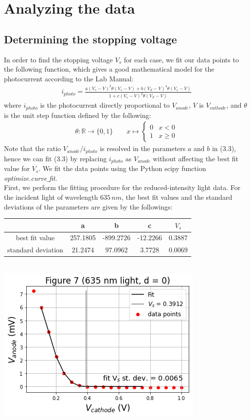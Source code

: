 \documentclass[11pt]{book}
\theoremstyle{break}
\theoremstyle{break}
\newcommand{\R}{\mathbb{R}}
\begin{document}
\hfill\break
\hfill\break
\hfill\break
\section{Analyzing the data}
\subsection{Determining the stopping voltage}
In order to find the stopping voltage $V_s$ for each case, we fit our data points to the following function, which gives a good mathematical model for the photocurrent according to the Lab Manual:
\begin{align}
i_{photo} = \frac{a(V_s - V)^2\theta(V_s - V) + b(V_S - V)^4 \theta(V_s -V)}{1+c(V_s - V)^2 \theta(V_S-V)}
\end{align}
where $i_{photo}$ is the photocurrent directly proportional to $V_{anode}$, $V$ is $V_{cathode}$, and $\theta$ is the unit step function defined by the following:
\begin{align*}
\theta: \R \to \{0,1\} \qquad x\mapsto \begin{cases}
0 & x<0 \\
1 & x\geq 0
\end{cases}
\end{align*}
Note that the ratio $V_{anode}/i_{photo}$ is resolved in the parameters $a$ and $b$ in (3.3), hence we can fit (3.3) by replacing $i_{photo}$ as $V_{anode}$ without affecting the best fit value for $V_s$. We fit the data points using the Python scipy function \textit{optimize.curve$\_$fit}.\\
\newpage
First, we perform the fitting procedure for the reduced-intensity light data. For the incident light of wavelength $635\, nm$, the best fit values and the standard deviations of the parameters are given by the followings:
\begin{center}
\begin{tabular}{|c|c|c|c|c|}
\hline
 & a & b & c & $V_s$\\
\hline
best fit value & 257.1805 & -899.2726 & -12.2266 & 0.3887\\
\hline
standard deviation & 21.2474 & 97.0962 & 3.7728 & 0.0069 \\
\hline
\end{tabular}\\
\hfill\break
\hfill\break
\includegraphics[scale=0.5]{fig7.png}
\end{center}
\end{document}
